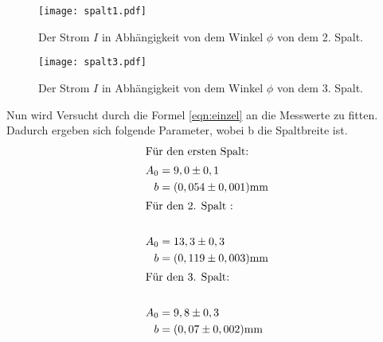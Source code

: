 \begin{figure}
  \centering
  \texttt{[image: spalt1.pdf]}
  \caption{ Der Strom $I$ in Abhängigkeit von dem Winkel $\phi$ von dem 2. Spalt.}
  \label{fig:spalt2}
\end{figure}
\FloatBarrier

\begin{figure}
  \centering
  \texttt{[image: spalt3.pdf]}
  \caption{ Der Strom $I$ in Abhängigkeit von dem Winkel $\phi$ von dem 3. Spalt.}
  \label{fig:spalt3}
\end{figure}
\FloatBarrier

Nun wird Versucht durch die Formel \eqref{eqn:einzel} an die Messwerte zu fitten.
Dadurch ergeben sich folgende Parameter, wobei b die Spaltbreite ist.
\begin{align*}
  \intertext{Für den ersten Spalt:}
  A_0&=9,0\pm0,1\\
 b&=(0,054\pm0,001)\si{\milli\meter}\\
\intertext{Für den 2. Spalt :}\\
  A_0&=13,3\pm0,3\\
 b&=(0,119\pm0,003)\si{\milli\meter}\\
\intertext{Für den 3. Spalt:}\\
  A_0&=9,8\pm0,3\\
 b&=(0,07\pm0,002)\si{\milli\meter}\\
\end{align*}

